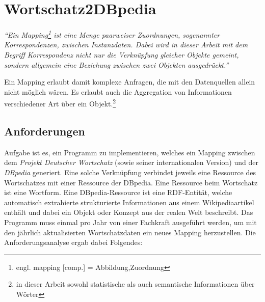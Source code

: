 \chapter{Wortschatz2DBpedia}\label{sec:wortschatz2dbpedia}

\begin{dfn}
\emph{"`Ein \emph{Mapping}\footnote{engl. mapping [comp.] = Abbildung,Zuordnung} ist eine Menge paarweiser Zuordnungen, sogenannter Korrespondenzen, zwischen Instanzdaten.
Dabei wird in dieser Arbeit mit dem Begriff Korrespondenz nicht nur die Verknüpfung gleicher Objekte gemeint, sondern allgemein eine Beziehung zwischen zwei Objekten ausgedrückt."'}\citep{thor-dissertation}

Ein Mapping erlaubt damit komplexe Anfragen, die mit den Datenquellen allein nicht möglich wären.
Es erlaubt auch die Aggregation von Informationen verschiedener Art über ein Objekt.\footnote{in dieser Arbeit sowohl statistische als auch semantische Informationen über Wörter}
\end{dfn}

\section{Anforderungen}\label{sec:anforderungen}

Aufgabe ist es, ein Programm zu implementieren, welches ein Mapping zwischen dem \emph{Projekt Deutscher Wortschatz} (sowie seiner internationalen Version) und der \emph{DBpedia} generiert.
Eine solche Verknüpfung verbindet jeweils eine Ressource des Wortschatzes mit einer Ressource der DBpedia.
Eine Ressource beim Wortschatz ist eine Wortform. Eine DBpedia-Ressource ist eine RDF-Entität, welche automatisch extrahierte strukturierte Informationen aus einem Wikipediaartikel enthält und 
dabei ein Objekt oder Konzept aus der realen Welt beschreibt.
Das Programm muss einmal pro Jahr von einer Fachkraft ausgeführt werden, um mit den jährlich aktualisierten Wortschatzdaten ein neues Mapping herzustellen.
Die Anforderungsanalyse ergab dabei Folgendes:

